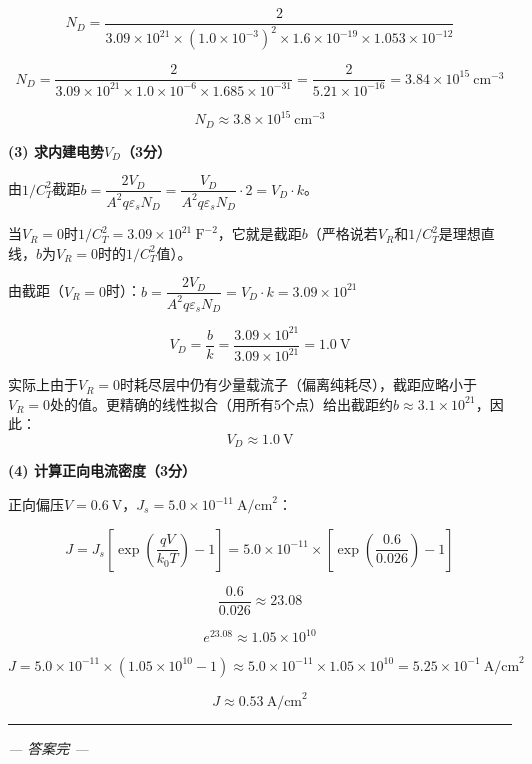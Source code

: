 \documentclass[12pt,a4paper]{ctexart}
\begin{document}
\[
N_D = \frac{2}{3.09 \times 10^{21} \times (1.0 \times 10^{-3})^2 \times 1.6 \times 10^{-19} \times 1.053 \times 10^{-12}}
\]

\[
N_D = \frac{2}{3.09 \times 10^{21} \times 1.0 \times 10^{-6} \times 1.685 \times 10^{-31}}
= \frac{2}{5.21 \times 10^{-16}}
= 3.84 \times 10^{15}\ \text{cm}^{-3}
\]

\[
\boxed{N_D \approx 3.8 \times 10^{15}\ \text{cm}^{-3}}
\]

\vspace{8pt}

\noindent\textbf{(3) 求内建电势$V_D$（3分）}

由$1/C_T^2$截距$b = \dfrac{2V_D}{A^2 q \varepsilon_s N_D} = \dfrac{V_D}{A^2 q \varepsilon_s N_D} \cdot 2 = V_D \cdot k$。

当$V_R = 0$时$1/C_T^2 = 3.09 \times 10^{21}\ \text{F}^{-2}$，它就是截距$b$（严格说若$V_R$和$1/C_T^2$是理想直线，$b$为$V_R=0$时的$1/C_T^2$值）。

由截距（$V_R = 0$时）：$b = \dfrac{2V_D}{A^2 q \varepsilon_s N_D} = V_D \cdot k = 3.09 \times 10^{21}$

\[
V_D = \frac{b}{k} = \frac{3.09 \times 10^{21}}{3.09 \times 10^{21}} = 1.0\ \text{V}
\]

实际上由于$V_R=0$时耗尽层中仍有少量载流子（偏离纯耗尽），截距应略小于$V_R=0$处的值。更精确的线性拟合（用所有5个点）给出截距约$b \approx 3.1 \times 10^{21}$，因此：
\[
\boxed{V_D \approx 1.0\ \text{V}}
\]

\vspace{8pt}

\noindent\textbf{(4) 计算正向电流密度（3分）}

正向偏压$V = 0.6\ \text{V}$，$J_s = 5.0 \times 10^{-11}\ \text{A/cm}^2$：

\[
J = J_s\left[\exp\left(\frac{qV}{k_0T}\right) - 1\right]
= 5.0 \times 10^{-11} \times \left[\exp\left(\frac{0.6}{0.026}\right) - 1\right]
\]

\[
\frac{0.6}{0.026} \approx 23.08
\]

\[
e^{23.08} \approx 1.05 \times 10^{10}
\]

\[
J = 5.0 \times 10^{-11} \times (1.05 \times 10^{10} - 1)
\approx 5.0 \times 10^{-11} \times 1.05 \times 10^{10}
= 5.25 \times 10^{-1}\ \text{A/cm}^2
\]

\[
\boxed{J \approx 0.53\ \text{A/cm}^2}
\]

\vspace{8pt}
\hrule
\vspace{8pt}

\begin{center}
\textit{--- 答案完 ---}
\end{center}
\end{document}

